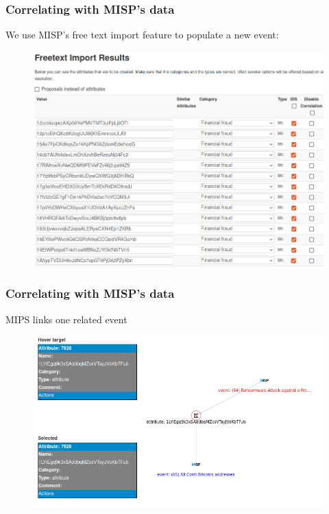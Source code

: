 \begin{frame}
    \frametitle{Correlating with MISP's data}
    We use MISP's free text import feature to populate a new event:

     \begin{figure}[t]
        \includegraphics[width=.75\textwidth]{pictures/contileaks-freetext.png}
        \centering
    \end{figure}
 
\end{frame}

\begin{frame}
    \frametitle{Correlating with MISP's data}
    MIPS links  one related event

     \begin{figure}[t]
        \includegraphics[width=.75\textwidth]{pictures/contileaks-correlation.png}
        \centering
    \end{figure}
 
\end{frame}


